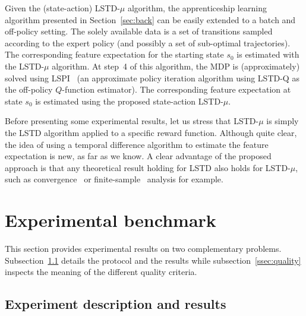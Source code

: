 \documentclass{llncs}
\begin{document}
Given the (state-action) LSTD-$\mu$ algorithm, the apprenticeship
learning algorithm presented in Section~\ref{sec:back} can be easily extended to a batch and
off-policy setting. The solely available data is a set of
transitions sampled according to the expert policy  (and possibly a set of sub-optimal trajectories). The
corresponding feature expectation for the starting state $s_0$ is
estimated with the LSTD-$\mu$ algorithm. At step~4 of this
algorithm, the MDP is (approximately) solved using
LSPI~\citep{lagoudakis2003least} (an approximate policy iteration
algorithm using LSTD-Q as the off-policy $Q$-function estimator).
The corresponding feature expectation at state $s_0$ is estimated
using the proposed state-action LSTD-$\mu$.

Before presenting some experimental results, let us stress that
LSTD-$\mu$ is simply the LSTD algorithm applied to a specific reward
function. Although quite clear, the idea of using a temporal
difference algorithm to estimate the feature expectation is new, as
far as we know. A clear advantage of the proposed approach is that
any theoretical result holding for LSTD also holds for LSTD-$\mu$,
such as convergence~\citep{nedic2003least} or
finite-sample~\citep{lazaric2010finiteLSTD} analysis for example.
\section{Experimental benchmark}
\label{sec:exp}
This section provides experimental results on two complementary problems. Subsection~\ref{ssec:exp} details the protocol and the results while subsection~\ref{ssec:quality} inspects the meaning of the different quality criteria. 
\subsection{Experiment description and results}
\label{ssec:exp}
\end{document}
